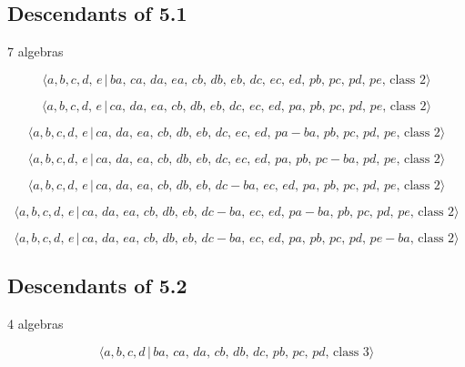 \documentclass[10pt]{article}
\begin{document}
\subsection{Descendants of 5.1}

7 algebras

\begin{equation}
\langle
a,b,c,d,\,e\,|\,ba,\,ca,\,da,\,ea,\,cb,\,db,\,eb,\,dc,\,ec,\,ed,\,pb,\,pc,%
\,pd,\,pe,\,\text{class }2\rangle  \tag{6.2}
\end{equation}

\begin{equation}
\langle
a,b,c,d,\,e\,|\,ca,\,da,\,ea,\,cb,\,db,\,eb,\,dc,\,ec,\,ed,\,pa,\,pb,\,pc,%
\,pd,\,pe,\,\text{class }2\rangle  \tag{6.3}
\end{equation}

\begin{equation}
\langle
a,b,c,d,\,e\,|\,ca,\,da,\,ea,\,cb,\,db,\,eb,\,dc,\,ec,\,ed,\,pa-ba,\,pb,%
\,pc,\,pd,\,pe,\,\text{class }2\rangle  \tag{6.4}
\end{equation}

\begin{equation}
\langle
a,b,c,d,\,e\,|\,ca,\,da,\,ea,\,cb,\,db,\,eb,\,dc,\,ec,\,ed,\,pa,\,pb,%
\,pc-ba,\,pd,\,pe,\,\text{class }2\rangle  \tag{6.5}
\end{equation}

\begin{equation}
\langle
a,b,c,d,\,e\,|\,ca,\,da,\,ea,\,cb,\,db,\,eb,\,dc-ba,\,ec,\,ed,\,pa,\,pb,%
\,pc,\,pd,\,pe,\,\text{class }2\rangle  \tag{6.6}
\end{equation}

\begin{equation}
\langle
a,b,c,d,\,e\,|\,ca,\,da,\,ea,\,cb,\,db,\,eb,\,dc-ba,\,ec,\,ed,\,pa-ba,\,pb,%
\,pc,\,pd,\,pe,\,\text{class }2\rangle  \tag{6.7}
\end{equation}

\begin{equation}
\langle
a,b,c,d,\,e\,|\,ca,\,da,\,ea,\,cb,\,db,\,eb,\,dc-ba,\,ec,\,ed,\,pa,\,pb,%
\,pc,\,pd,\,pe-ba,\,\text{class }2\rangle  \tag{6.8}
\end{equation}

\subsection{Descendants of 5.2}

4 algebras

\begin{equation}
\langle a,b,c,d\,|\,ba,\,ca,\,da,\,cb,\,db,\,dc,\,pb,\,pc,\,pd,\,\text{
class }3\rangle  \tag{6.63}
\end{equation}
\end{document}
